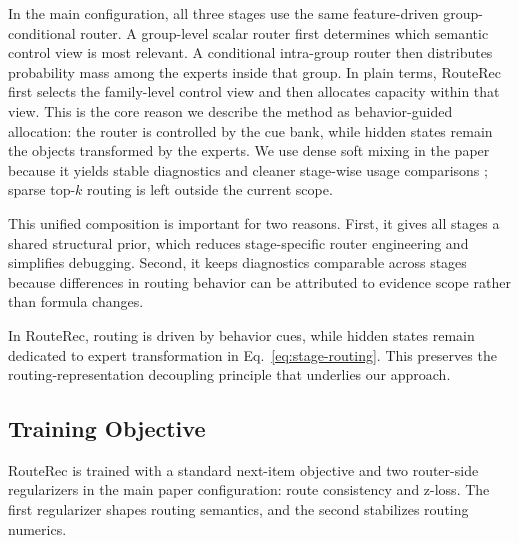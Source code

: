 \documentclass[sigconf,review,anonymous]{acmart}
\begin{document}
In the main configuration, all three stages use the same feature-driven group-conditional router. A group-level scalar router first determines which semantic control view is most relevant. A conditional intra-group router then distributes probability mass among the experts inside that group. In plain terms, RouteRec first selects the family-level control view and then allocates capacity within that view. This is the core reason we describe the method as behavior-guided allocation: the router is controlled by the cue bank, while hidden states remain the objects transformed by the experts. We use dense soft mixing in the paper because it yields stable diagnostics and cleaner stage-wise usage comparisons \cite{zoph2022stmoe,zhou2022expertchoice}; sparse top-$k$ routing is left outside the current scope.

This unified composition is important for two reasons. First, it gives all stages a shared structural prior, which reduces stage-specific router engineering and simplifies debugging. Second, it keeps diagnostics comparable across stages because differences in routing behavior can be attributed to evidence scope rather than formula changes.

In RouteRec, routing is driven by behavior cues, while hidden states remain dedicated to expert transformation in Eq.~\eqref{eq:stage-routing}. This preserves the routing-representation decoupling principle that underlies our approach.

\subsection{Training Objective}
\label{sec:training-objective}

RouteRec is trained with a standard next-item objective and two router-side regularizers in the main paper configuration: route consistency and z-loss. The first regularizer shapes routing semantics, and the second stabilizes routing numerics.
\end{document}
